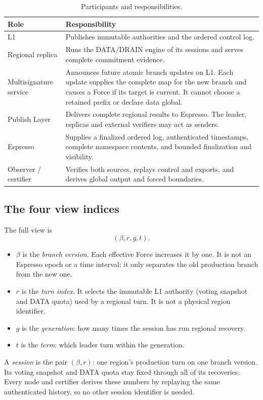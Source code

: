 \documentclass[11pt,a4paper]{article}
\newcommand{\defterm}[1]{\textcolor{rrBlue}{\textit{#1}}}
\begin{document}
\begin{table}[htbp]\centering\small
\caption{Participants and responsibilities.}\label{tab:roles}
\begin{tabularx}{\linewidth}{@{}>{\raggedright\arraybackslash}p{.19\linewidth}Y@{}}\toprule
Role & Responsibility\\\midrule
L1 & Publishes immutable authorities and the ordered control log.\\
Regional replica & Runs the DATA/DRAIN engine of its sessions and
serves complete commitment evidence.\\
Multisignature service & Announces future atomic branch updates on L1.
Each update supplies the complete map for the new branch and causes a
Force if its target is current. It cannot choose a retained prefix or
declare data global.\\
Publish Layer & Delivers complete regional results to Espresso. The
leader, replicas and external verifiers may act as senders.\\
Espresso & Supplies a finalized ordered log, authenticated timestamps,
complete namespace contents, and bounded finalization and visibility.\\
Observer / certifier & Verifies both sources, replays control and
exports, and derives global output and forced boundaries.\\
\bottomrule
\end{tabularx}
\end{table}

\subsection{The four view indices}
The full view is
\[
 (\beta,r,g,t).
\]
\begin{itemize}
\item $\beta$ is the \defterm{branch version}. Each effective Force
increases it by one. It is not an Espresso epoch or a time interval; it
only separates the old production branch from the new one.
\item $r$ is the \defterm{turn index}. It selects the immutable L1
authority (voting snapshot and DATA quota) used by a regional turn. It
is not a physical region identifier.
\item $g$ is the \defterm{generation}: how many times the session has
run regional recovery.
\item $t$ is the \defterm{term}: which leader turn within the
generation.
\end{itemize}
A \defterm{session} is the pair $(\beta,r)$: one region's production
turn on one branch version. Its voting snapshot and DATA quota stay
fixed through all of its recoveries. Every node and certifier derives
these numbers by replaying the same authenticated history, so no other
session identifier is needed.
\end{document}
